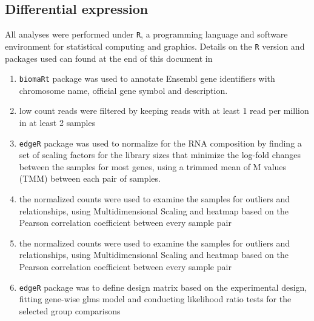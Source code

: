 \documentclass[12pt]{article}
\begin{document}
\subsection{Differential expression}
All analyses were performed under \texttt{R}, a programming language and software environment for statistical computing and graphics. Details on the \texttt{R} version and packages used can found at the end of this document in 
\begin{enumerate}
  \item \texttt{biomaRt} package was used to annotate Ensembl gene identifiers with chromosome name, official gene symbol and description. 
  \item low count reads were filtered by keeping reads with at least 1 read per million in at least 2 samples
  \item \texttt{edgeR} package was used to normalize for the RNA composition by finding a set of scaling factors for the library sizes that minimize the log-fold changes between the samples for most genes, using a trimmed mean of M values (TMM) between each pair of samples.
  \item the normalized counts were used to examine the samples for outliers and relationships, using Multidimensional Scaling and heatmap based on the Pearson correlation coefficient between every sample pair
    \item the normalized counts were used to examine the samples for outliers and relationships, using Multidimensional Scaling and heatmap based on the Pearson correlation coefficient between every sample pair
    \item \texttt{edgeR} package was to define design matrix based on the experimental design, fitting gene-wise glms model and conducting likelihood ratio tests for the selected group comparisons
\end{enumerate}
\end{document}
